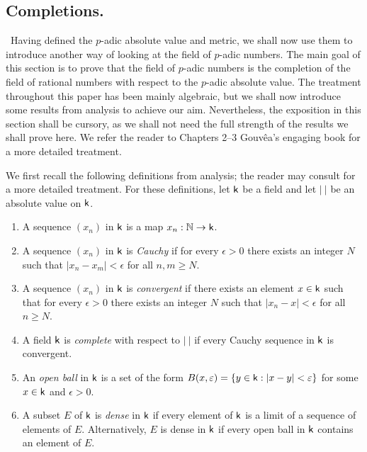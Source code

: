 \subsection{Completions.}~Having defined the \(p\)-adic absolute value and metric, we shall now use them to introduce another way of looking at the field of \(p\)-adic numbers. The main goal of this section is to prove that the field of \(p\)-adic numbers is the completion of the field of rational numbers with respect to the \(p\)-adic absolute value. The treatment throughout this paper has been mainly algebraic, but we shall now introduce some results from analysis to achieve our aim. Nevertheless, the exposition in this section shall be cursory, as we shall not need the full strength of the results we shall prove here. We refer the reader to Chapters 2--3 Gouv\^ea's engaging book \cite{gouvea1997p} for a more detailed treatment.

We first recall the following definitions from analysis; the reader may consult \cite{rudin1976principles} for a more detailed treatment. For these definitions, let \(\mathsf{k}\) be a field and let \(|\ |\) be an absolute value on \(\mathsf{k}\). 

\begin{enumerate}[nosep, label=(\roman*)]
    \item A sequence \((x_n)\) in \(\mathsf{k}\) is a map \(x_n : \mathbb{N} \to \mathsf{k}\).
    \item A sequence \((x_n)\) in \(\mathsf{k}\) is \emph{Cauchy} if for every \(\epsilon > 0\) there exists an integer \(N\) such that \(|x_n - x_m| < \epsilon\) for all \(n, m \geq N\).
    \item A sequence \((x_n)\) in \(\mathsf{k}\) is \emph{convergent} if there exists an element \(x \in \mathsf{k}\) such that for every \(\epsilon > 0\) there exists an integer \(N\) such that \(|x_n - x| < \epsilon\) for all \(n \geq N\).
    \item A field \(\mathsf{k}\) is \emph{complete} with respect to \(|\ |\) if every Cauchy sequence in \(\mathsf{k}\) is convergent.
    \item An \emph{open ball} in \(\mathsf{k}\) is a set of the form \(B(x,\varepsilon) = \{y \in \mathsf{k} : |x - y| < \varepsilon\}\) for some \(x \in \mathsf{k}\) and \(\epsilon > 0\).
    \item A subset \(E\) of \(\mathsf{k}\) is \emph{dense} in \(\mathsf{k}\) if every element of \(\mathsf{k}\) is a limit of a sequence of elements of \(E\). Alternatively, \(E\) is dense in \(\mathsf{k}\) if every open ball in \(\mathsf{k}\) contains an element of \(E\).
\end{enumerate}

